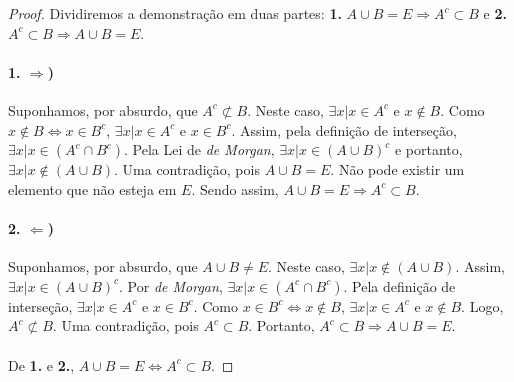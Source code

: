 \documentclass[11pt,a4paper]{report}
\begin{document}
    \begin{proof}
    Dividiremos a demonstração em duas partes: \textbf{1.} $A \cup B = E \Rightarrow A^c \subset B$ e \textbf{2.} $A^c \subset B \Rightarrow A \cup B = E$.

    \paragraph{1. $\Rightarrow$)}
    Suponhamos, por absurdo, que $A^c \not\subset B$. Neste caso, $\exists x| x \in A^c$ e $x \not\in B$. Como $x \not\in B \Leftrightarrow x \in B^c$, $\exists x| x \in A^c$ e $x \in B^c$. Assim, pela definição de interseção, $\exists x| x \in (A^c \cap B^c)$. Pela Lei de \textit{de Morgan}, $\exists x| x \in (A \cup B)^c$ e portanto, $\exists x | x \not\in (A \cup B)$. Uma contradição, pois $A \cup B = E$. Não pode existir um elemento que não esteja em $E$. Sendo assim, $A \cup B = E \Rightarrow A^c \subset B$.

    \paragraph{2. $\Leftarrow$)}
    Suponhamos, por absurdo, que $A \cup B \not= E$. Neste caso, $\exists x | x \not\in (A \cup B)$. Assim, $\exists x | x \in (A \cup B)^c$. Por \textit{de Morgan}, $\exists x | x \in (A^c \cap B^c)$. Pela definição de interseção, $\exists x | x \in A^c$ e $x \in B^c$. Como $x \in B^c \Leftrightarrow x \not\in B$, $\exists x | x \in A^c$ e $x \not\in B$. Logo, $A^c \not\subset B$. Uma contradição, pois $A^c \subset B$. Portanto, $A^c \subset B \Rightarrow A \cup B = E$.
    
    \paragraph{}
    De \textbf{1.} e \textbf{2.}, $A \cup B = E \Leftrightarrow A^c \subset B$.
    \end{proof}
\end{document}
